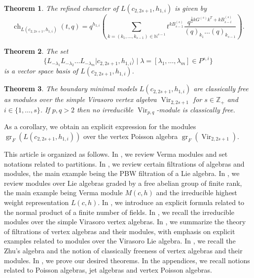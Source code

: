 \documentclass[a4paper, 12pt, reqno]{amsart}
\newtheorem{theorem}{Theorem}[section]
\theoremstyle{remark}
\DeclareMathOperator{\Vir}{Vir}
\DeclareMathOperator{\ch}{ch}
\DeclareMathOperator{\gr}{gr}
\begin{document}
\begin{theorem}
  \label{thr:1}
  The refined character of $L(c_{2, 2s + 1}, h_{1, i})$ is given by
  \begin{equation*}
    \ch_{L(c_{2, 2s + 1}, h_{1, i})}(t, q) = q^{h_{1, i}}\left(\sum_{k = (k_1, \dots, k_{s - 1}) \in \mathbb{N}^{s - 1}}t^{kB^{(s)}_{s - 1}}\frac{q^{\frac{1}{2}kG^{(s)}k^T + kB^{(s)}_{s - i}}}{(q)_{k_1}\dots(q)_{k_{s - 1}}}\right).
  \end{equation*}
\end{theorem}

\begin{theorem}
  \label{thr:2}
  The set
  \begin{equation*}
    \{L_{-\lambda_1}L_{-\lambda_2}\dots L_{-\lambda_m}|c_{2, 2s + 1}, h_{1, i}\rangle \mid \lambda = [\lambda_1, \dots, \lambda_m] \in P^{s, i}\}
  \end{equation*}
  is a vector space basis of $L(c_{2, 2s + 1}, h_{1, i})$.
\end{theorem}

\begin{theorem}
  \label{thr:3}
  The boundary minimal models $L(c_{2, 2s + 1}, h_{1, i})$ are classically free as modules over the simple Virasoro vertex algebra $\Vir_{2, 2s + 1}$ for $s \in \mathbb{Z}_+$ and $i \in \{1, \dots, s\}$.
  If $p, q > 2$ then no irreducible $\Vir_{p, q}$-module is classically free.
\end{theorem}
As a corollary, we obtain an explicit expression for the modules $\gr_F(L(c_{2, 2s + 1}, h_{1, i}))$ over the vertex Poisson algebra $\gr_F(\Vir_{2, 2s + 1})$.

This article is organized as follows.
In , we review Verma modules and set notations related to partitions.
In , we review certain filtrations of algebras and modules, the main example being the PBW filtration of a Lie algebra.
In , we review modules over Lie algebras graded by a free abelian group of finite rank, the main example being Verma module $M(c, h)$ and the irreducible highest weight representation $L(c, h)$.
In , we introduce an explicit formula related to the normal product of a finite number of fields.
In , we recall the irreducible modules over the simple Virasoro vertex algebras.
In , we summarize the theory of filtrations of vertex algebras and their modules, with emphasis on explicit examples related to modules over the Virasoro Lie algebra.
In , we recall the Zhu's algebra and the notion of classically freeness of vertex algebras and their modules.
In , we prove our desired theorems.
In the appendices, we recall notions related to Poisson algebras, jet algebras and vertex Poisson algebras.
\end{document}
